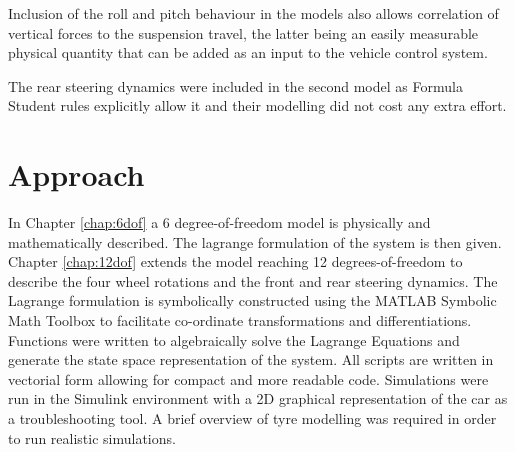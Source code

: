 Inclusion of the roll and pitch behaviour in the models also allows correlation of vertical forces to the suspension travel, the latter being an easily measurable physical quantity that can be added as an input to the vehicle control system.

The rear steering dynamics were included in the second model as Formula Student rules explicitly allow it and their modelling did not cost any extra effort.

\section{Approach}
\label{sec:approach}
In Chapter \ref{chap:6dof} a 6 degree-of-freedom model is physically and mathematically described. The lagrange formulation of the system is then given. Chapter \ref{chap:12dof} extends the model reaching 12 degrees-of-freedom to describe the four wheel rotations and the front and rear steering dynamics.
The Lagrange formulation is symbolically constructed using the MATLAB Symbolic Math Toolbox to facilitate co-ordinate transformations and differentiations.
Functions were written to algebraically solve the Lagrange Equations and generate the state space representation of the system.
All scripts are written in vectorial form allowing for compact and more readable code.
Simulations were run in the Simulink environment with a 2D graphical representation of the car as a troubleshooting tool.
A brief overview of tyre modelling was required in order to run realistic simulations.
